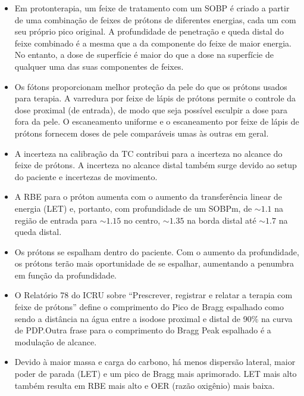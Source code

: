 \documentclass[11pt,a4paper]{article}
\newcounter{exemplo}
\begin{document}
\begin{exemplo}
    \begin{itemize}
        \item Em protonterapia, um feixe de tratamento com um SOBP é criado a partir de uma combinação de feixes de prótons de diferentes energias, cada um com seu próprio pico original. A profundidade de penetração e queda distal do feixe combinado é a mesma que a da componente do feixe de maior energia. No entanto, a dose de superfície é maior do que a dose na superfície de qualquer uma das suas componentes de feixes.
        
        \item Os fótons proporcionam melhor proteção da pele do que os prótons usados para terapia. A varredura por feixe de lápis de prótons permite o controle da dose proximal (de entrada), de modo que seja possível esculpir a dose para fora da pele. O escaneamento uniforme e o escaneamento por feixe de lápis de prótons fornecem doses de pele comparáveis umas às outras em geral.
        
        \item A incerteza na calibração da TC contribui para a incerteza no alcance do feixe de prótons. A incerteza no alcance distal também surge devido ao setup do paciente e incertezas de movimento.
        
        \item A RBE para o próton aumenta com o aumento da transferência linear de energia (LET) e, portanto, com profundidade de um SOBPm, de $\sim 1.1$ na região de entrada para $\sim 1.15$ no centro, $\sim 1.35$ na borda distal até  $\sim 1.7$ na queda distal.
        
        \item Os prótons se espalham dentro do paciente. Com o aumento da profundidade, os prótons terão mais oportunidade de se espalhar, aumentando a penumbra em função da profundidade.
        
        \item O Relatório 78 do ICRU sobre “Prescrever, registrar e relatar a terapia com feixe de prótons” define o comprimento do Pico de Bragg espalhado como sendo a distância na água entre a isodose proximal e distal de 90\%  na curva de PDP.Outra frase para o comprimento do Bragg Peak espalhado é a modulação de alcance.
        
        \item Devido à maior massa e carga do carbono, há menos dispersão lateral, maior poder de parada (LET) e um pico de Bragg mais aprimorado. LET mais alto também resulta em RBE mais alto e OER (razão oxigênio) mais baixa.
        

\end{itemize}
\end{exemplo}
\end{document}
